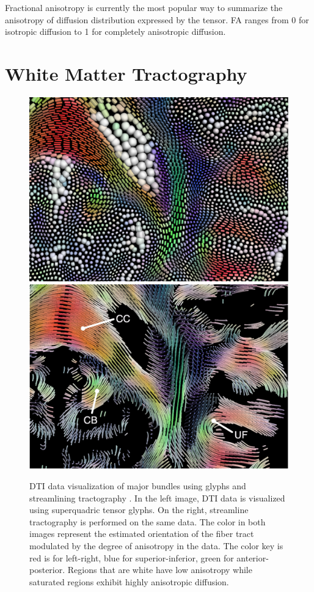 Fractional anisotropy is currently the most popular way to summarize the anisotropy of diffusion distribution expressed by the tensor.  FA ranges from 0 for isotropic diffusion to 1 for completely anisotropic diffusion.


\section{White Matter Tractography}



\begin{figure} \label{fig:visualization}
	\includegraphics[width=0.5\linewidth]{packedglyphs}
	\includegraphics[width=0.5\linewidth]{tractography}
	\caption{DTI data visualization of major bundles using glyphs and streamlining tractography \cite{KindlmannTVCG2006}.  In the left image, DTI data is visualized using superquadric tensor glyphs. On the right, streamline tractography is performed on the same data.  The color in both images represent the estimated orientation of the fiber tract modulated by the degree of anisotropy in the data.  The color key is red is for left-right, blue for superior-inferior, green for anterior-posterior.  Regions that are white have low anisotropy while saturated regions exhibit highly anisotropic diffusion.}
\end{figure}


